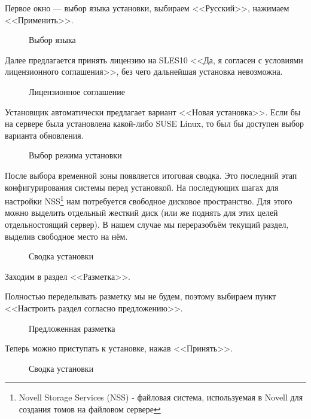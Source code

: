 Первое окно — выбор языка установки, выбираем <<Русский>>, нажимаем <<Применить>>.
\begin{figure}[H]
\caption{Выбор языка}
\label{fig2}
\end{figure}
\clearpage

Далее предлагается принять лицензию на SLES10 <<Да, я согласен с условиями лицензионного соглашения>>, без чего дальнейшая установка невозможна.
\begin{figure}[H]
\caption{Лицензионное соглашение}
\label{fig3}
\end{figure}
\clearpage

Установщик автоматически предлагает вариант <<Новая установка>>. Если бы на сервере была установлена какой-либо SUSE Linux, то был бы доступен выбор варианта обновления.
\begin{figure}[H]
\caption{Выбор режима установки}
\label{fig4}
\end{figure}
\clearpage

После выбора временной зоны появляется итоговая сводка. Это последний этап конфигурирования системы перед установкой. На последующих шагах для настройки NSS\footnote{Novell Storage Services (NSS) - файловая система, используемая в Novell для создания томов на файловом сервере} нам потребуется свободное дисковое пространство. Для этого можно выделить отдельный жесткий диск (или же поднять для этих целей отдельностоящий сервер). В нашем случае мы переразобъём текущий раздел, выделив свободное место на нём.
\begin{figure}[H]
\caption{Сводка установки}
\label{p1}
\end{figure}
Заходим в раздел <<Разметка>>.
\clearpage

Полностью переделывать разметку мы не будем, поэтому выбираем пункт <<Настроить раздел согласно предложению>>.
\begin{figure}[H]
\caption{Предложенная разметка}
\label{p2}
\end{figure}
\clearpage

Теперь можно приступать к установке, нажав <<Принять>>.
\begin{figure}[H]
\caption{Сводка установки}
\label{p5}
\end{figure}
\clearpage

